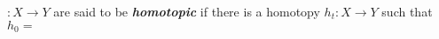 \documentclass[preview]{standalone}
\begin{document}
\begin{center}
$ : X\to Y$ are said to be \textbf{\textit{homotopic}} if there is a homotopy $h_t : X\to Y$ such that $h_0=$
\end{center}
\end{document}
